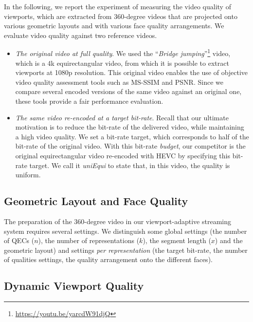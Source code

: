 In the following, we report the experiment of measuring the video quality of viewports, which
are extracted from 360-degree videos that are projected onto various geometric layouts and 
with various
face quality arrangements. We evaluate video quality against two reference videos.
\begin{itemize}
\item \emph{The original video at full quality}. We used the
``\emph{Bridge
jumping}''\footnote{\url{https://youtu.be/yarcdW91djQ}} video, which is a 4k equirectangular
video, from which it is possible to extract viewports at 1080p resolution. This original video 
enables the use of objective video quality assessment tools such as \ac{MS-SSIM} and
\ac{PSNR}. Since we compare several encoded versions of the same video against an original
one, these tools provide
a fair performance evaluation.
\item \emph{The same video re-encoded at a target bit-rate}. Recall that our ultimate motivation 
is to reduce the bit-rate of the delivered video, while maintaining a high video quality. We set
a bit-rate target, which corresponds to half of the bit-rate of the original video. With this bit-rate
\emph{budget}, our competitor is the original equirectangular video re-encoded with 
\ac{HEVC} by specifying this bit-rate target. We call it \emph{uniEqui} to state that, in this
video, the quality is uniform. 
\end{itemize}

\subsection{Geometric Layout and Face Quality}
\label{sec:geometry}
The preparation of the 360-degree video in our viewport-adaptive streaming system
requires several settings. We distinguish some global settings (the number of \acp{QEC} ($n$), 
the number of representations ($k$), the segment length ($x$) and the geometric layout) 
and settings \emph{per representation}
(the target bit-rate, the number of qualities settings, the quality arrangement onto the different
faces).

\subsection{Dynamic Viewport Quality}
\label{sec:qoe}